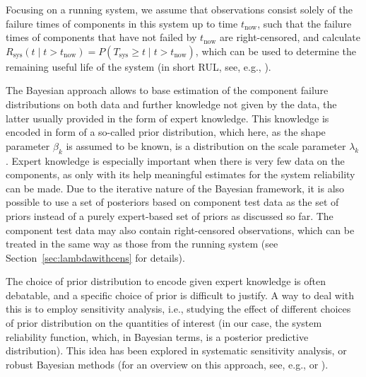 \documentclass[Journal,SectionNumbers,InsideFigs]{ascelike}
\newcommand{\Rsys}{R_\text{sys}}
\def\Rsys{R_\text{sys}}
\def\Tsys{T_\text{sys}}
\def\tnow{t_\text{now}}
\begin{document}
Focusing on a running system,
we assume that observations consist solely of the failure times of components in this system up to time $\tnow$,
such that the failure times of components that have not failed by $\tnow$ are right-censored,
and calculate $\Rsys(t \mid t > \tnow) = P(\Tsys \geq t \mid t > \tnow)$,
which can be used to determine the remaining useful life of the system
(in short RUL, see, e.g., ).

The Bayesian approach allows to base estimation of the component failure distributions
on both data and further knowledge not given by the data,
the latter usually provided in the form of expert knowledge.
This knowledge is encoded in form of a so-called prior distribution,
which here, as the shape parameter $\beta_k$ is assumed to be known,
is a distribution on the scale parameter $\lambda_k$. %
Expert knowledge is especially important when there is very few data on the components, %
as only with its help meaningful estimates for the system reliability can be made.
%
Due to the iterative nature of the Bayesian framework,
it is also possible to use a set of posteriors based on component test data as the set of priors
instead of a purely expert-based set of priors as discussed so far.
The component test data may also contain right-censored observations,
which can be treated in the same way as those from the running system
(see Section~\ref{sec:lambdawithcens} for details).

The choice of prior distribution to encode given expert knowledge is often debatable,
and a specific choice of prior is difficult to justify.
A way to deal with this is to employ sensitivity analysis,
i.e., studying the effect of different choices of prior distribution on the quantities of interest
(in our case, the system reliability function, which, in Bayesian terms, is a posterior predictive distribution).
This idea has been explored in systematic sensitivity analysis, or robust Bayesian methods
(for an overview on this approach, see, e.g.,
 or ). %
\end{document}
